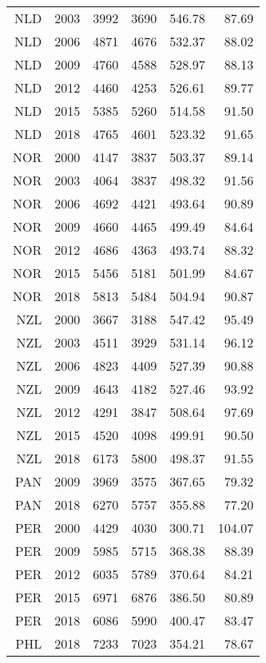 \begin{longtable}{|r|r|r|r|r|r|}
    NLD   & 2003  & 3992  & 3690  & 546.78 & 87.69 \\
    NLD   & 2006  & 4871  & 4676  & 532.37 & 88.02 \\
    NLD   & 2009  & 4760  & 4588  & 528.97 & 88.13 \\
    NLD   & 2012  & 4460  & 4253  & 526.61 & 89.77 \\
    NLD   & 2015  & 5385  & 5260  & 514.58 & 91.50 \\
    NLD   & 2018  & 4765  & 4601  & 523.32 & 91.65 \\
    NOR   & 2000  & 4147  & 3837  & 503.37 & 89.14 \\
    NOR   & 2003  & 4064  & 3837  & 498.32 & 91.56 \\
    NOR   & 2006  & 4692  & 4421  & 493.64 & 90.89 \\
    NOR   & 2009  & 4660  & 4465  & 499.49 & 84.64 \\
    NOR   & 2012  & 4686  & 4363  & 493.74 & 88.32 \\
    NOR   & 2015  & 5456  & 5181  & 501.99 & 84.67 \\
    NOR   & 2018  & 5813  & 5484  & 504.94 & 90.87 \\
    NZL   & 2000  & 3667  & 3188  & 547.42 & 95.49 \\
    NZL   & 2003  & 4511  & 3929  & 531.14 & 96.12 \\
    NZL   & 2006  & 4823  & 4409  & 527.39 & 90.88 \\
    NZL   & 2009  & 4643  & 4182  & 527.46 & 93.92 \\
    NZL   & 2012  & 4291  & 3847  & 508.64 & 97.69 \\
    NZL   & 2015  & 4520  & 4098  & 499.91 & 90.50 \\
    NZL   & 2018  & 6173  & 5800  & 498.37 & 91.55 \\
    PAN   & 2009  & 3969  & 3575  & 367.65 & 79.32 \\
    PAN   & 2018  & 6270  & 5757  & 355.88 & 77.20 \\
    PER   & 2000  & 4429  & 4030  & 300.71 & 104.07 \\
    PER   & 2009  & 5985  & 5715  & 368.38 & 88.39 \\
    PER   & 2012  & 6035  & 5789  & 370.64 & 84.21 \\
    PER   & 2015  & 6971  & 6876  & 386.50 & 80.89 \\
    PER   & 2018  & 6086  & 5990  & 400.47 & 83.47 \\
    PHL   & 2018  & 7233  & 7023  & 354.21 & 78.67 \\

\end{longtable}
